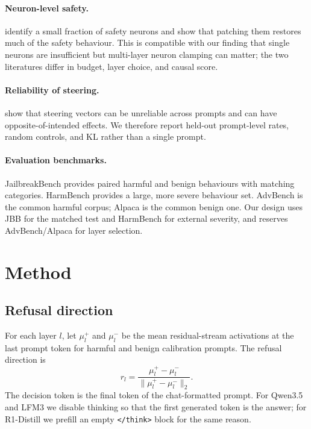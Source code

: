 \documentclass[twoside,11pt]{article}
\begin{document}
\paragraph{Neuron-level safety.}
\citet{chen2024safetyneurons} identify a small fraction of safety neurons and show
that patching them restores much of the safety behaviour. This is compatible with
our finding that single neurons are insufficient but multi-layer neuron clamping can
matter; the two literatures differ in budget, layer choice, and causal score.

\paragraph{Reliability of steering.}
\citet{tan2024reliability} show that steering vectors can be unreliable across
prompts and can have opposite-of-intended effects. We therefore report held-out
prompt-level rates, random controls, and KL rather than a single prompt.

\paragraph{Evaluation benchmarks.}
JailbreakBench \citep{chao2024jailbreakbench} provides paired harmful and benign
behaviours with matching categories. HarmBench \citep{mazeika2024harmbench} provides
a large, more severe behaviour set. AdvBench \citep{zou2023universal} is the common
harmful corpus; Alpaca is the common benign one. Our design uses JBB for the matched
test and HarmBench for external severity, and reserves AdvBench/Alpaca for layer
selection.

\section{Method}

\subsection{Refusal direction}

For each layer $l$, let $\mu_l^{+}$ and $\mu_l^{-}$ be the mean residual-stream
activations at the last prompt token for harmful and benign calibration prompts.
The refusal direction is
\begin{equation}
r_l = \frac{\mu_l^{+} - \mu_l^{-}}{\lVert \mu_l^{+} - \mu_l^{-}\rVert_2}.
\end{equation}
The decision token is the final token of the chat-formatted prompt. For Qwen3.5 and
LFM3 we disable thinking so that the first generated token is the answer; for
R1-Distill we prefill an empty \texttt{</think>} block for the same reason.
\end{document}
